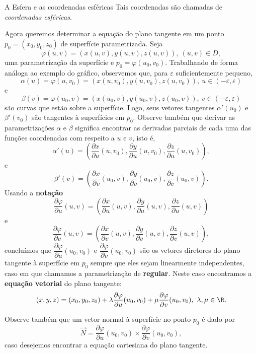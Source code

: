 \begin{example}{A Esfera e as coordenadas esféricas}{}
Tais coordenadas são chamadas de \textit{coordenadas esféricas}. 
\end{example}

Agora queremos determinar a equação do plano tangente em um ponto $p_0=(x_0,y_0,z_0)$ de  superfície parametrizada. Seja 
\[
\varphi(u, v) = (x(u, v), y(u, v), z(u, v)),~(u,v)\in D,
\]
uma parametrização da superfície e $p_0=\varphi(u_0,v_0)$. 
Trabalhando de forma análoga ao exemplo do gráfico, observemos que, para $\varepsilon$ suficientemente pequeno, 
$$\alpha(u)=\varphi(u, v_0) = (x(u, v_0), y(u, v_0), z(u, v_0)),~ u \in (-\varepsilon,\varepsilon)$$
e
$$\beta(v)=\varphi(u_0, v) = (x(u_0, v), y(u_0, v), z(u_0, v)),~ v \in (-\varepsilon,\varepsilon)$$
são curvas que estão sobre a superfície. Logo, seus vetores tangentes $\alpha'(u_0)$ e $\beta'(v_0)$ são tangentes à superfícies em $p_0$. 
Observe também que derivar as parametrizações $\alpha$ e $\beta$ significa encontrar as derivadas parciais de cada uma das {funções coordenadas} com respeito a $u$ e $v$, isto é,
$$\alpha'(u)= \left(\dfrac{\partial x}{\partial u}(u, v_0), \dfrac{\partial y}{\partial u}(u, v_0), \dfrac{\partial z}{\partial u}(u, v_0)\right),$$
e
$$\beta'(v)=  \left(\dfrac{\partial x}{\partial v}(u_0, v), \dfrac{\partial y}{\partial v}(u_0, v), \dfrac{\partial z}{\partial v}(u_0, v)\right).$$
Usando a \textbf{notação} 
$$\dfrac{\partial \varphi}{\partial u} (u,v)= \left(\dfrac{\partial x}{\partial u}(u, v), \dfrac{\partial y}{\partial u}(u, v), \dfrac{\partial z}{\partial u}(u, v)\right)
$$
e
$$\dfrac{\partial \varphi}{\partial v} (u,v)=\left(\dfrac{\partial x}{\partial v}(u, v), \dfrac{\partial y}{\partial v}(u, v), \dfrac{\partial z}{\partial v}(u, v)\right),$$
concluímos que 
$\dfrac{\partial \varphi}{\partial u} (u_0,v_0)$ e $\dfrac{\partial \varphi}{\partial v} (u_0,v_0)$ são os vetores diretores do plano tangente à superfície em $p_0$ sempre que eles sejam linearmente independentes, caso em que chamamos a parametrização de  \textbf{regular}. Neste caso encontramos a \textbf{equação vetorial} do plano tangente:
$$(x,y,z)=(x_0,y_0,z_0)+\lambda  \dfrac{\partial \varphi}{\partial u} (u_0,v_0) + \mu \dfrac{\partial \varphi}{\partial v} (u_0,v_0),~\lambda,\mu\in\R.$$

Observe também que um vetor normal à superfície no ponto $p_0$ é dado por 
$$\vec{N}=\dfrac{\partial \varphi}{\partial u} (u_0,v_0)\times \dfrac{\partial \varphi}{\partial v} (u_0,v_0),$$
caso desejemos encontrar a equação cartesiana do plano tangente. 



